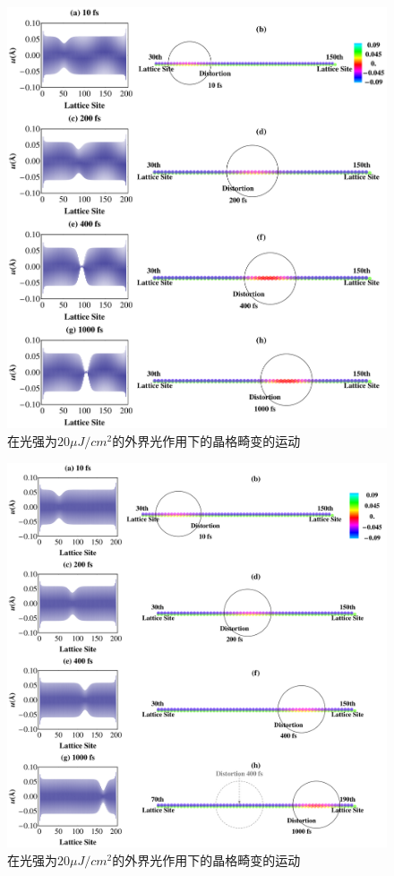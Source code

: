 \documentclass[12pt,]{report}
\begin{document}
\begin{figure}[h!]
    \centering
    \includegraphics[scale=0.3]{./figures/chfigoutStraight.png}
    \caption{在光强为$20\mu J/cm^2$的外界光作用下的晶格畸变的运动}
    \label{fig:e20chain}
\end{figure}

\begin{figure}[h!]
    \centering
    \includegraphics[scale=0.3]{./figures/chfigweakoutStraight.png}
    \caption{在光强为$20\mu J/cm^2$的外界光作用下的晶格畸变的运动}
    \label{fig:e02chain}
\end{figure}
\end{document}
